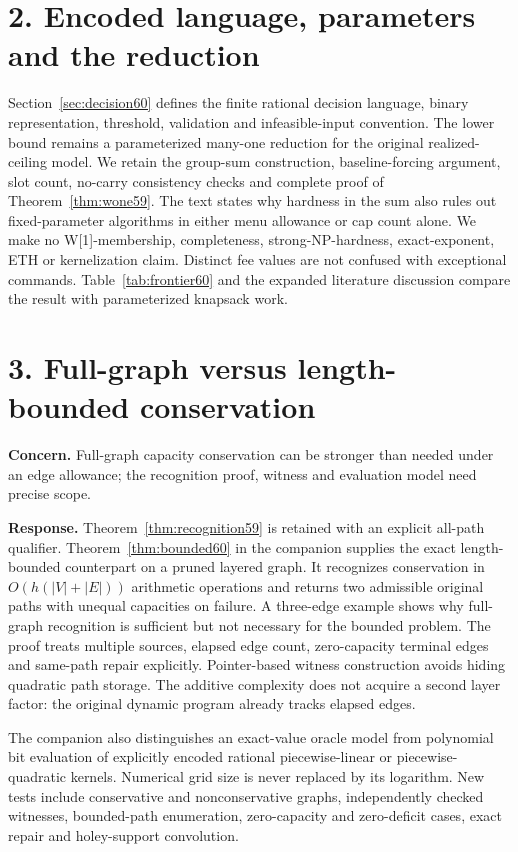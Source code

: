 \documentclass[11pt,letterpaper]{article}
\theoremstyle{definition}\newtheorem{remark}[theorem]{Remark}
\begin{document}
\section*{2. Encoded language, parameters and the reduction}
Section~\ref{sec:decision60} defines the finite rational decision language, binary representation, threshold, validation and infeasible-input convention. The lower bound remains a parameterized many-one reduction for the original realized-ceiling model. We retain the group-sum construction, baseline-forcing argument, slot count, no-carry consistency checks and complete proof of Theorem~\ref{thm:wone59}. The text states why hardness in the sum also rules out fixed-parameter algorithms in either menu allowance or cap count alone. We make no W[1]-membership, completeness, strong-NP-hardness, exact-exponent, ETH or kernelization claim. Distinct fee values are not confused with exceptional commands. Table~\ref{tab:frontier60} and the expanded literature discussion compare the result with parameterized knapsack work.

\section*{3. Full-graph versus length-bounded conservation}
\textbf{Concern.} Full-graph capacity conservation can be stronger than needed under an edge allowance; the recognition proof, witness and evaluation model need precise scope.

\textbf{Response.} Theorem~\ref{thm:recognition59} is retained with an explicit all-path qualifier. Theorem~\ref{thm:bounded60} in the companion supplies the exact length-bounded counterpart on a pruned layered graph. It recognizes conservation in $O(h(|V|+|E|))$ arithmetic operations and returns two admissible original paths with unequal capacities on failure. A three-edge example shows why full-graph recognition is sufficient but not necessary for the bounded problem. The proof treats multiple sources, elapsed edge count, zero-capacity terminal edges and same-path repair explicitly. Pointer-based witness construction avoids hiding quadratic path storage. The additive complexity does not acquire a second layer factor: the original dynamic program already tracks elapsed edges.

The companion also distinguishes an exact-value oracle model from polynomial bit evaluation of explicitly encoded rational piecewise-linear or piecewise-quadratic kernels. Numerical grid size is never replaced by its logarithm. New tests include conservative and nonconservative graphs, independently checked witnesses, bounded-path enumeration, zero-capacity and zero-deficit cases, exact repair and holey-support convolution.
\end{document}
